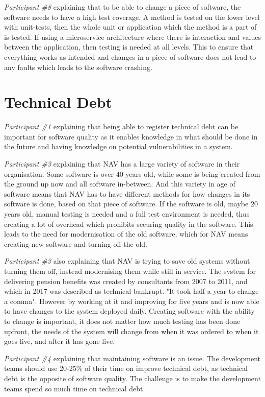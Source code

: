 \textit{Participant \#8} explaining that to be able to change a piece of software, the software needs to have a high test coverage. A method is tested on the lower level with unit-tests, then the whole unit or application which the method is a part of is tested. If using a microservice architecture where there is interaction and values between the application, then testing is needed at all levels. This to ensure that everything works as intended and changes in a piece of software does not lead to any faults which leads to the software crashing.

\section{Technical Debt}
\textit{Participant \#1} explaining that being able to register technical debt can be important for software quality as it enables knowledge in what should be done in the future and having knowledge on potential vulnerabilities in a system.

\textit{Participant \#3} explaining that NAV has a large variety of software in their organisation. Some software is over 40 years old, while some is being created from the ground up now and all software in-between. And this variety in age of software means that NAV has to have different methods for how changes in its software is done, based on that piece of software. If the software is old, maybe 20 years old, manual testing is needed and a full test environment is needed, thus creating a lot of overhead which prohibits securing quality in the software. This leads to the need for modernisation of the old software, which for NAV means creating new software and turning off the old.

\textit{Participant \#3} also explaining that NAV is trying to save old systems without turning them off, instead modernising them while still in service. The system for delivering pension benefits was created by consultants from 2007 to 2011, and which in 2017 was described as technical bankrupt. "It took half a year to change a comma". However by working at it and improving for five years and is now able to have changes to the system deployed daily. Creating software with the ability to change is important, it does not matter how much testing has been done upfront, the needs of the system will change from when it was ordered to when it goes live, and after it has gone live.

\textit{Participant \#4} explaining that maintaining software is an issue. The development teams should use 20-25\% of their time on improve technical debt, as technical debt is the opposite of software quality. The challenge is to make the development teams spend so much time on technical debt.

